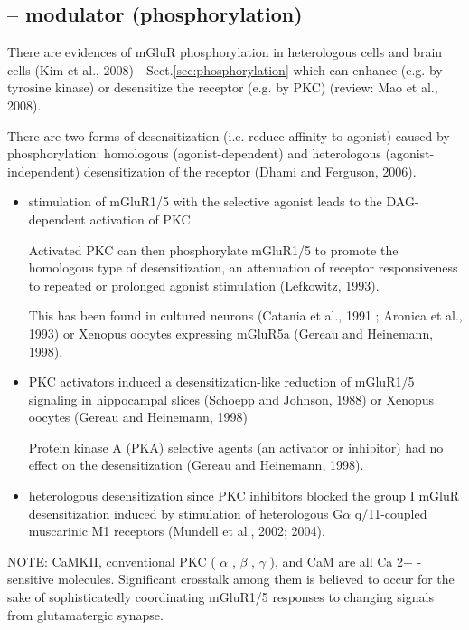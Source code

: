 \subsection{-- modulator (phosphorylation)}
\label{sec:mGluR_group-1-phosphorylation}

There are evidences of mGluR phosphorylation in heterologous cells and brain
cells (Kim et al., 2008) - Sect.\ref{sec:phosphorylation} which can enhance
(e.g. by tyrosine kinase) or desensitize the receptor (e.g. by PKC) (review:
Mao et al., 2008).


There are two forms of desensitization (i.e. reduce affinity to agonist) caused
by phosphorylation: homologous (agonist-dependent) and heterologous
(agonist-independent) desensitization of the receptor (Dhami and Ferguson, 2006).
\begin{itemize}
  \item  stimulation of mGluR1/5 with the selective agonist leads to the DAG-
dependent activation of PKC

Activated PKC can then phosphorylate mGluR1/5 to promote the homologous type of
desensitization, an attenuation of receptor responsiveness to repeated or
prolonged agonist stimulation (Lefkowitz, 1993).

This has been found in cultured neurons (Catania et al., 1991 ; Aronica et al.,
1993) or Xenopus oocytes expressing mGluR5a (Gereau and Heinemann, 1998).
 

  \item PKC activators induced a desensitization-like reduction of mGluR1/5
  signaling in hippocampal slices (Schoepp and Johnson, 1988) or Xenopus
 oocytes (Gereau and Heinemann, 1998)

Protein kinase A (PKA) selective agents (an activator or inhibitor) had no
effect on the desensitization (Gereau and Heinemann, 1998).

  \item heterologous desensitization since PKC inhibitors blocked the group I
  mGluR desensitization induced by stimulation of heterologous G$\alpha$
  q/11-coupled muscarinic M1 receptors (Mundell et al., 2002; 2004).


\end{itemize}


NOTE: CaMKII, conventional PKC ( $\alpha$ , $\beta$ , $\gamma$ ), and CaM are
all Ca 2+ -sensitive molecules.
Significant crosstalk among them is believed to occur for the sake of
sophisticatedly coordinating mGluR1/5 responses to changing signals from
glutamatergic synapse.

